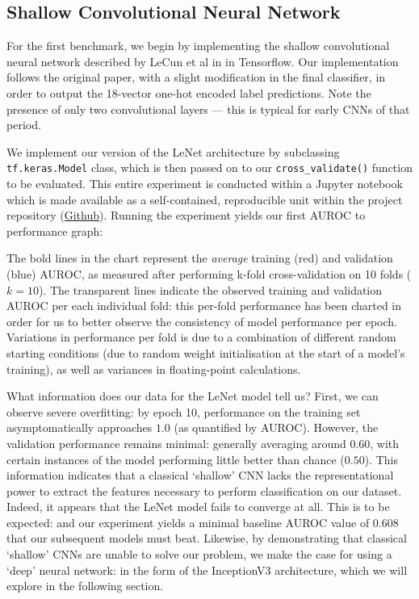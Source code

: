 \subsection{Shallow Convolutional Neural Network}

For the first benchmark, we begin by implementing the shallow convolutional neural network described by LeCun et al in \autocite{lenet1998} in Tensorflow. Our implementation follows the original paper, with a slight modification in the final classifier, in order to output the 18-vector one-hot encoded label predictions. Note the presence of only two convolutional layers --- this is typical for early CNNs of that period.



\noindent
We implement our version of the LeNet architecture by subclassing \texttt{tf.keras.Model} class, which is then passed on to our \texttt{cross_validate()} function to be evaluated. This entire experiment is conducted within a Jupyter notebook which is made available as a self-contained, reproducible unit within the project repository (\href{https://github.com/ShenZhouHong/radiography-ai-project/blob/master/python/initial-evaluation/lenet1998.ipynb}{Github}). Running the experiment yields our first AUROC to performance graph:



\noindent 
The bold lines in the chart represent the \emph{average} training (red) and validation (blue) AUROC, as measured after performing k-fold cross-validation on 10 folds (\(k = 10\)). The transparent lines indicate the observed training and validation AUROC per each individual fold: this per-fold performance has been charted in order for us to better observe the consistency of model performance per epoch. Variations in performance per fold is due to a combination of different random starting conditions (due to random weight initialisation at the start of a model's training), as well as variances in floating-point calculations.

What information does our data for the LeNet model tell us? First, we can observe severe overfitting: by epoch 10, performance on the training set asymptomatically approaches $1.0$ (as quantified by AUROC). However, the validation performance remains minimal: generally averaging around $0.60$, with certain instances of the model performing little better than chance ($0.50$). This information indicates that a classical \enquote*{shallow} CNN lacks the representational power to extract the features necessary to perform classification on our dataset. Indeed, it appears that the LeNet model fails to converge at all. This is to be expected: and our experiment yields a minimal baseline AUROC value of $0.608$ that our subsequent models must beat. Likewise, by demonstrating that classical \enquote*{shallow} CNNs are unable to solve our problem, we make the case for using a \enquote*{deep} neural network: in the form of the InceptionV3 architecture, which we will explore in the following section.

